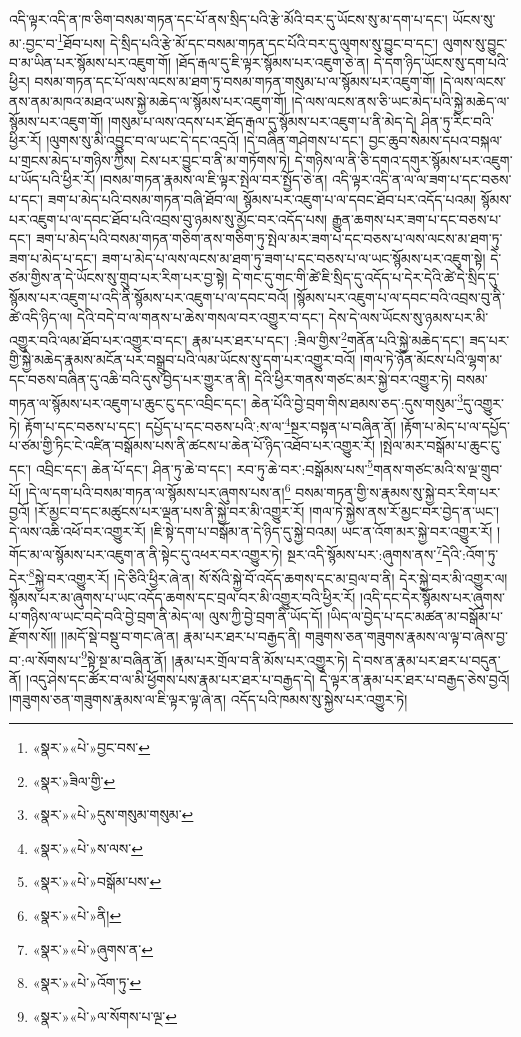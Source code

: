 འདི་ལྟར་འདི་ན་ཁ་ཅིག་བསམ་གཏན་དང་པོ་ནས་སྲིད་པའི་རྩེ་མོའི་བར་དུ་ཡོངས་སུ་མ་དག་པ་དང་། ཡོངས་སུ་མ་:བྱང་བ་\footnote{«སྣར་»«པེ་»བྱང་བས་}ཐོབ་པས། དེ་སྲིད་པའི་རྩེ་མོ་དང་བསམ་གཏན་དང་པོའི་བར་དུ་ལུགས་སུ་བྱུང་བ་དང་། ལུགས་སུ་བྱུང་བ་མ་ཡིན་པར་སྙོམས་པར་འཇུག་གོ། །ཐོད་རྒལ་དུ་ཇི་ལྟར་སྙོམས་པར་འཇུག་ཅེ་ན། དེ་དག་ཉིད་ཡོངས་སུ་དག་པའི་ཕྱིར། བསམ་གཏན་དང་པོ་ལས་ལངས་མ་ཐག་ཏུ་བསམ་གཏན་གསུམ་པ་ལ་སྙོམས་པར་འཇུག་གོ། །དེ་ལས་ལངས་ནས་ནམ་མཁའ་མཐའ་ཡས་སྐྱེ་མཆེད་ལ་སྙོམས་པར་འཇུག་གོ། །དེ་ལས་ལངས་ནས་ཅི་ཡང་མེད་པའི་སྐྱེ་མཆེད་ལ་སྙོམས་པར་འཇུག་གོ། །གསུམ་པ་ལས་འདས་པར་ཐོད་རྒལ་དུ་སྙོམས་པར་འཇུག་པ་ནི་མེད་དེ། ཤིན་ཏུ་རིང་བའི་ཕྱིར་རོ། །ལུགས་སུ་མི་འབྱུང་བ་ལ་ཡང་དེ་དང་འདྲའོ། །དེ་བཞིན་གཤེགས་པ་དང་། བྱང་ཆུབ་སེམས་དཔའ་བསྐལ་པ་གྲངས་མེད་པ་གཉིས་ཀྱིས། ངེས་པར་བྱུང་བ་ནི་མ་གཏོགས་ཏེ། དེ་གཉིས་ལ་ནི་ཅི་དགའ་དགུར་སྙོམས་པར་འཇུག་པ་ཡོད་པའི་ཕྱིར་རོ། །བསམ་གཏན་རྣམས་ལ་ཇི་ལྟར་སྤེལ་བར་སྤྱོད་ཅེ་ན། འདི་ལྟར་འདི་ན་ལ་ལ་ཟག་པ་དང་བཅས་པ་དང་། ཟག་པ་མེད་པའི་བསམ་གཏན་བཞི་ཐོབ་ལ། སྙོམས་པར་འཇུག་པ་ལ་དབང་ཐོབ་པར་འདོད་པའམ། སྙོམས་པར་འཇུག་པ་ལ་དབང་ཐོབ་པའི་འབྲས་བུ་ཉམས་སུ་མྱོང་བར་འདོད་པས། རྒྱུན་ཆགས་པར་ཟག་པ་དང་བཅས་པ་དང་། ཟག་པ་མེད་པའི་བསམ་གཏན་གཅིག་ནས་གཅིག་ཏུ་སྤེལ་མར་ཟག་པ་དང་བཅས་པ་ལས་ལངས་མ་ཐག་ཏུ་ཟག་པ་མེད་པ་དང་། ཟག་པ་མེད་པ་ལས་ལངས་མ་ཐག་ཏུ་ཟག་པ་དང་བཅས་པ་ལ་ཡང་སྙོམས་པར་འཇུག་སྟེ། དེ་ཙམ་གྱིས་ན་དེ་ཡོངས་སུ་གྲུབ་པར་རིག་པར་བྱ་སྟེ། དེ་གང་དུ་གང་གི་ཚེ་ཇི་སྲིད་དུ་འདོད་པ་དེར་དེའི་ཚེ་དེ་སྲིད་དུ་སྙོམས་པར་འཇུག་པ་འདི་ནི་སྙོམས་པར་འཇུག་པ་ལ་དབང་བའོ། །སྙོམས་པར་འཇུག་པ་ལ་དབང་བའི་འབྲས་བུ་ནི་ཚེ་འདི་ཉིད་ལ། དེའི་བདེ་བ་ལ་གནས་པ་ཆེས་གསལ་བར་འགྱུར་བ་དང་། དེས་དེ་ལས་ཡོངས་སུ་ཉམས་པར་མི་འགྱུར་བའི་ལམ་ཐོབ་པར་འགྱུར་བ་དང་། རྣམ་པར་ཐར་པ་དང་། :ཟིལ་གྱིས་\footnote{«སྣར་»ཟིལ་གྱི་}གནོན་པའི་སྐྱེ་མཆེད་དང་། ཟད་པར་གྱི་སྐྱེ་མཆེད་རྣམས་མངོན་པར་བསྒྲུབ་པའི་ལམ་ཡོངས་སུ་དག་པར་འགྱུར་བའོ། །གལ་ཏེ་ཉོན་མོངས་པའི་ལྷག་མ་དང་བཅས་བཞིན་དུ་འཆི་བའི་དུས་བྱེད་པར་གྱུར་ན་ནི། དེའི་ཕྱིར་གནས་གཙང་མར་སྐྱེ་བར་འགྱུར་ཏེ། བསམ་གཏན་ལ་སྙོམས་པར་འཇུག་པ་ཆུང་ངུ་དང་འབྲིང་དང་། ཆེན་པོའི་བྱེ་བྲག་གིས་ཐམས་ཅད་:དུས་གསུམ་\footnote{«སྣར་»«པེ་»དུས་གསུམ་གསུམ་}དུ་འགྱུར་ཏེ། རྟོག་པ་དང་བཅས་པ་དང་། དཔྱོད་པ་དང་བཅས་པའི་:ས་ལ་\footnote{«སྣར་»«པེ་»ས་ལས་}སྔར་བསྟན་པ་བཞིན་ནོ། །རྟོག་པ་མེད་པ་ལ་དཔྱོད་པ་ཙམ་གྱི་ཏིང་ངེ་འཛིན་བསྒོམས་པས་ནི་ཚངས་པ་ཆེན་པོ་ཉིད་འཐོབ་པར་འགྱུར་རོ། །སྤེལ་མར་བསྒོམ་པ་ཆུང་ངུ་དང་། འབྲིང་དང་། ཆེན་པོ་དང་། ཤིན་ཏུ་ཆེ་བ་དང་། རབ་ཏུ་ཆེ་བར་:བསྒོམས་པས་\footnote{«སྣར་»«པེ་»བསྒོམ་པས་}གནས་གཙང་མའི་ས་ལྔ་གྲུབ་པོ། །དེ་ལ་དག་པའི་བསམ་གཏན་ལ་སྙོམས་པར་ཞུགས་པས་ན།\footnote{«སྣར་»«པེ་»ནི།} བསམ་གཏན་གྱི་ས་རྣམས་སུ་སྐྱེ་བར་རིག་པར་བྱའོ། །རོ་མྱང་བ་དང་མཚུངས་པར་ལྡན་པས་ནི་སྐྱེ་བར་མི་འགྱུར་རོ། །གལ་ཏེ་སྐྱེས་ནས་རོ་མྱང་བར་བྱེད་ན་ཡང་། དེ་ལས་འཆི་འཕོ་བར་འགྱུར་རོ། །ཇི་སྟེ་དག་པ་བསྒོམ་ན་དེ་ཉིད་དུ་སྐྱེ་བའམ། ཡང་ན་འོག་མར་སྐྱེ་བར་འགྱུར་རོ། །གོང་མ་ལ་སྙོམས་པར་འཇུག་ན་ནི་སྟེང་དུ་འཕར་བར་འགྱུར་ཏེ། སྔར་འདི་སྙོམས་པར་:ཞུགས་ནས་\footnote{«སྣར་»«པེ་»ཞུགས་ན་}དེའི་:འོག་ཏུ་དེར་\footnote{«སྣར་»«པེ་»འོག་ཏུ་}སྐྱེ་བར་འགྱུར་རོ། །དེ་ཅིའི་ཕྱིར་ཞེ་ན། སོ་སོའི་སྐྱེ་བོ་འདོད་ཆགས་དང་མ་བྲལ་བ་ནི། དེར་སྐྱེ་བར་མི་འགྱུར་ལ། སྙོམས་པར་མ་ཞུགས་པ་ཡང་འདོད་ཆགས་དང་བྲལ་བར་མི་འགྱུར་བའི་ཕྱིར་རོ། །འདི་དང་དེར་སྙོམས་པར་ཞུགས་པ་གཉིས་ལ་ཡང་བདེ་བའི་བྱེ་བྲག་ནི་མེད་ལ། ལུས་ཀྱི་བྱེ་བྲག་ནི་ཡོད་དོ། །ཡིད་ལ་བྱེད་པ་དང་མཚན་མ་བསྒོམ་པ་རྫོགས་སོ།། །།མདོ་སྡེ་བསྡུ་བ་གང་ཞེ་ན། རྣམ་པར་ཐར་པ་བརྒྱད་ནི། གཟུགས་ཅན་གཟུགས་རྣམས་ལ་ལྟ་བ་ཞེས་བྱ་བ་:ལ་སོགས་པ་\footnote{«སྣར་»«པེ་»ལ་སོགས་པ་ལྔ་}སྟེ་སྔ་མ་བཞིན་ནོ། །རྣམ་པར་གྲོལ་བ་ནི་མོས་པར་འགྱུར་ཏེ། དེ་བས་ན་རྣམ་པར་ཐར་པ་བདུན་ནོ། །འདུ་ཤེས་དང་ཚོར་བ་ལ་མི་ཕྱོགས་པས་རྣམ་པར་ཐར་པ་བརྒྱད་དེ། དེ་ལྟར་ན་རྣམ་པར་ཐར་པ་བརྒྱད་ཅེས་བྱའོ། །གཟུགས་ཅན་གཟུགས་རྣམས་ལ་ཇི་ལྟར་ལྟ་ཞེ་ན། འདོད་པའི་ཁམས་སུ་སྐྱེས་པར་འགྱུར་ཏེ། 